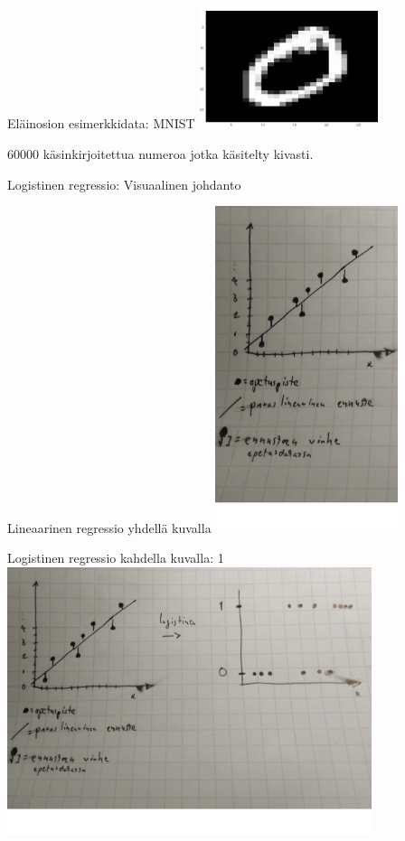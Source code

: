 \documentclass[presentation]{beamer}
\begin{document}
\begin{frame}{Eläinosion esimerkkidata: MNIST}
    \includegraphics[width=0.4\textwidth]{mnist2.png}
    
    60000 käsinkirjoitettua numeroa jotka käsitelty kivasti.
\end{frame}

\begin{frame}{Logistinen regressio: Visuaalinen johdanto}
    
\end{frame}

\begin{frame}{Lineaarinen regressio yhdellä kuvalla}
        \includegraphics[width=0.4\textwidth]{lineaarinen1.jpg}
\end{frame}

\begin{frame}{Logistinen regressio kahdella kuvalla: 1}
    \includegraphics[width=0.8\textwidth]{logistinen1.jpg}
\end{frame}
\end{document}
